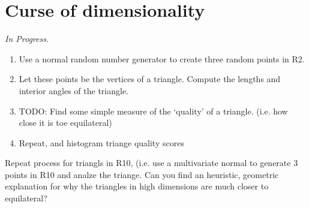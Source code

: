 \section{Curse of dimensionality}

\textit{In Progress.}

\begin{enumerate}
  \item Use a normal random number generator to create three random points in R2.
  \item Let these points be the vertices of a triangle. Compute the lengths and interior angles of the triangle.
  \item TODO: Find some simple measure of the `quality' of a triangle. (i.e. how close it is toe equilateral)
  \item Repeat, and histogram triange quality scores
\end{enumerate}

Repeat process for triangls in R10, (i.e. use a multivariate normal to generate 3 points in R10 and analze the triange.
Can you find an heuristic, geometric explanation for why the triangles in high dimensions are much closer to equilateral?
